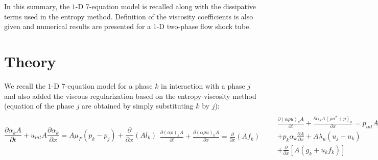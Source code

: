 \documentclass{anstrans}
\begin{document}
In this summary, the $1$-D 7-equation model is recalled along with the dissipative terms used 
in the entropy method. Definition of the viscosity coefficients is also given and numerical 
results are presented for a $1$-D two-phase flow shock tube.
%
\section{Theory}
%
We recall the $1$-D 7-equation model for a phase $k$ in interaction with a phase $j$ and also added the viscous regularization  based on the entropy-viscosity 
method (equation of the phase $j$ are obtained by simply substituting $k$ by $j$):
\begin{subequations}
\label{eq:euler_visc}
%
\begin{equation}\label{eq:vf_eq}
  \frac{\partial \alpha_{k} A}{\partial t} + u_{int} A \frac{\partial \alpha_{k}}{\partial x}
  = A \mu_P (p_{k} - p_{j}) + \boxed{\frac{\partial }{\partial x} \left( A l_k  \right)}
\end{equation}
%
\begin{eqnarray}
  \frac{\partial \left( \alpha \rho \right)_{k} A}{\partial t}
  + \frac{\partial \left( \alpha \rho u \right)_{k} A}{\partial x}
  = \boxed{\frac{\partial }{\partial x} \left( A f_k \right)}
\end{eqnarray}
%
\begin{eqnarray}
 && \frac{\partial \left( \alpha \rho u \right)_{k} A}{\partial t}
  + \frac{\partial \alpha_{k} A \left( \rho u^2 + p \right)_{k} }{\partial x}   = p_{int} A \frac{\partial \alpha_{k}}{\partial x} \nonumber \\
 &&+ p_{k} \alpha_{k} \frac{\partial A}{\partial x}
  + A \lambda_u (u_{j} - u_{k}) \nonumber \\
 && + \boxed{\frac{\partial }{\partial x} \left[ A \left( g_k + u_k f_k \right) \right] }
\end{eqnarray}
%
\begin{eqnarray}
 &&\frac{\partial \left( \alpha \rho E \right)_{k} A}{\partial t}
  + \frac{\partial \alpha_{k} u_{k} A \left( \rho E + p \right)_{k}}{\partial x}
  = p_{int} u_{int} A \frac{\partial \alpha_{k}}{\partial x} 
  \nonumber \\
  &&- \bar{p}_{int} A \mu_P (p_{k} - p_{j})+ \bar{u}_{int} A \lambda_u (u_{j} - u_{k})
  \nonumber \\
 && + \boxed{\frac{\partial }{\partial x} \left[ A \left( h_k + u_k g_k - \frac{u_k^2}{2}f_k + \rho_k e_k l_k\right) \right] }
\end{eqnarray}
%
\end{subequations}
\end{document}
